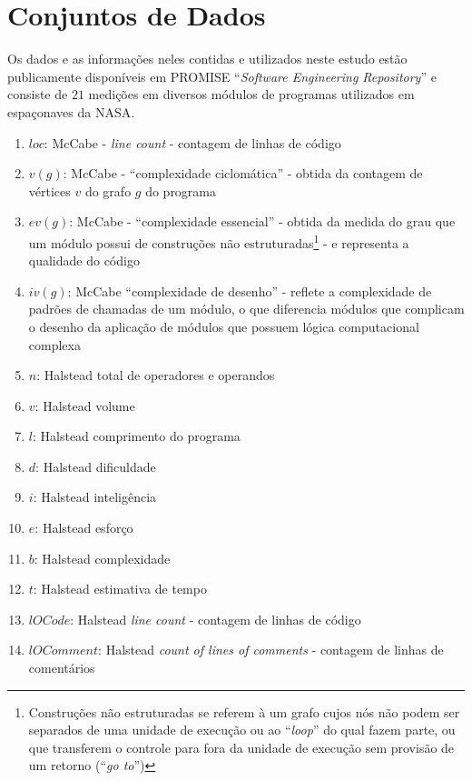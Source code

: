 \documentclass[10pt]{article}
\begin{document}
\section{Conjuntos de Dados}

    Os dados e as informações neles contidas e utilizados neste estudo estão publicamente disponíveis em PROMISE ``\textit{Software Engineering Repository}'' \cite{Sayyad-Shirabad+Menzies:2005} e consiste de $21$ medições em diversos módulos de programas utilizados em espaçonaves da \gls{NASA}.

    \begin{enumerate}
        \item $loc$: McCabe - \textit{line count} - contagem de linhas de código
        \item $v(g)$: McCabe - ``complexidade ciclomática'' - obtida da contagem de vértices $v$ do grafo $g$ do programa
        \item $ev(g)$: McCabe - ``complexidade essencial'' - obtida da medida do grau que um módulo possui de construções não estruturadas\footnote{Construções não estruturadas se referem à um grafo cujos nós não podem ser separados de uma unidade de execução ou ao ``\textit{loop}'' do qual fazem parte, ou que transferem o controle para fora da unidade de execução sem provisão de um retorno (``\textit{go to}'')} - e representa a qualidade do código
        \item $iv(g)$: McCabe ``complexidade de desenho'' - reflete a complexidade de padrões de chamadas de um módulo, o que diferencia módulos que complicam o desenho da aplicação de módulos que possuem lógica computacional complexa
        \item $n$: Halstead total de operadores e operandos
        \item $v$: Halstead volume
        \item $l$: Halstead comprimento do programa
        \item $d$: Halstead dificuldade
        \item $i$: Halstead inteligência
        \item $e$: Halstead esforço
        \item $b$: Halstead complexidade
        \item $t$: Halstead estimativa de tempo
        \item $lOCode$: Halstead \textit{line count} - contagem de linhas de código
        \item $lOComment$: Halstead \textit{count of lines of comments} - contagem de linhas de comentários

\end{enumerate}
\end{document}
